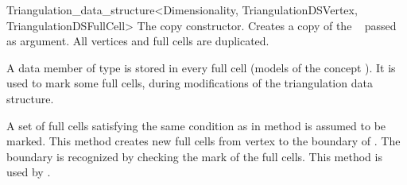 \begin{ccRefClass}{Triangulation_data_structure<Dimensionality, TriangulationDSVertex, TriangulationDSFullCell>}
{The copy constructor. Creates a copy of the \ccRefName\  passed as
    argument. All vertices and full cells are duplicated.}

\begin{ccAdvanced}

\ccTypes

{A data member of type  is stored in every full cell (models
of the concept ).  It is used to mark
some 
full cells, during modifications of the triangulation data structure.}


{A set  of full cells satisfying the same condition as in method
\ccRefName{} is assumed to be marked. This
method creates new full cells from vertex  to the boundary of .
The boundary is recognized by checking the mark of the full cells.
This method is used by \ccRefName{}.}

\end{ccAdvanced}

\ccSeeAlso

\\
\\

\end{ccRefClass}
